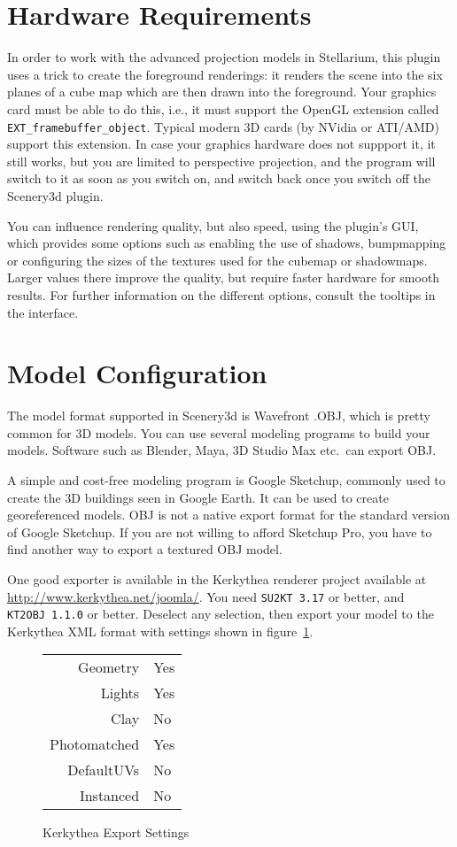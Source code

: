 \documentclass[a4paper]{article}
\newcommand{\filename}[1]{\texttt{#1}}
\begin{document}
\section{Hardware Requirements}
\label{sec:HardwareRequirements}


In order to work with the advanced projection models in Stellarium,
this plugin uses a trick to create the foreground renderings: it
renders the scene into the six planes of a cube map which are then
drawn into the foreground. Your graphics card must be able to do this,
i.e., it must support the OpenGL extension called
\texttt{EXT\_framebuffer\_object}. Typical modern 3D cards (by NVidia
or ATI/AMD) support this extension. In case your graphics hardware
does not suppport it, it still works, but you are limited to
perspective projection, and the program will switch to it as soon as
you switch on, and switch back once you switch off the Scenery3d
plugin.

You can influence rendering quality, but also speed, using the plugin's 
GUI, which provides some options such as enabling the use
of shadows, bumpmapping or configuring the sizes of the textures used
for the cubemap or shadowmaps. Larger values there improve the quality,
but require faster hardware for smooth results. For further information
on the different options, consult the tooltips in the interface.


\section{Model Configuration}
\label{sec:ModelConfiguration}


The model format supported in Scenery3d is Wavefront .OBJ, which is
pretty common for 3D models.  You can use several modeling programs to
build your models. Software such as Blender, Maya, 3D Studio
Max etc.\ can export OBJ. 

A simple and cost-free modeling program is Google Sketchup, commonly
used to create the 3D buildings seen in Google Earth. It can be used
to create georeferenced models.  OBJ is not a native export format for
the standard version of Google Sketchup. If you are not willing to
afford Sketchup Pro, you have to find another way to export a textured
OBJ model.

One good exporter is available in the Kerkythea renderer project
available at \url{http://www.kerkythea.net/joomla/}.  You need \filename{SU2KT~3.17}
or better, and \filename{KT2OBJ~1.1.0} or better.  Deselect any selection, then
export your model to the Kerkythea XML format with settings shown in figure~\ref{fig:KerkytheaExportSettings}.
\begin{figure}[hb]
  \centering
\begin{tabular}{rl}
Geometry&Yes\\Lights&Yes\\Clay&No\\Photomatched&Yes\\DefaultUVs&No\\Instanced&No
\end{tabular}
\caption{Kerkythea Export Settings}
  \label{fig:KerkytheaExportSettings}
\end{figure}
\end{document}
